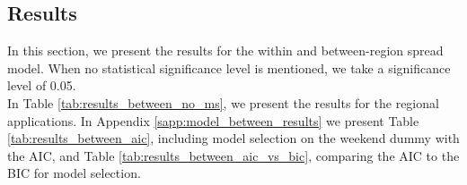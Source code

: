 \documentclass[12pt]{article}
\begin{document}
	\subsection{Results} \label{subsec:model_between_results}
	In this section, we present the results for the within and between-region spread model. When no statistical significance level is mentioned, we take a significance level of 0.05.
	\\
	
	In Table \ref{tab:results_between_no_ms}, we present the results for the regional applications. In Appendix \ref{sapp:model_between_results} we present Table \ref{tab:results_between_aic}, including model selection on the weekend dummy with the AIC, and Table \ref{tab:results_between_aic_vs_bic}, comparing the AIC to the BIC for model selection.
	
\end{document}
